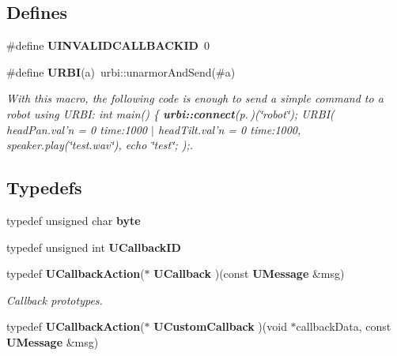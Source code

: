\subsection*{Defines}
\begin{CompactItemize}
\item 
\#define {\bf UINVALIDCALLBACKID}\ 0\label{uabstractclient_8h_a0}

\item 
\#define {\bf URBI}(a)\ urbi::unarmor\-And\-Send(\#a)
\begin{CompactList}\small\item\em With this macro, the following code is enough to send a simple command to a robot using URBI: int main() \{ {\bf urbi::connect}{\rm (p.\,\pageref{namespaceurbi_a7})}(\char`\"{}robot\char`\"{}); URBI( head\-Pan.val'n = 0 time:1000 $|$ head\-Tilt.val'n = 0 time:1000, speaker.play(\char`\"{}test.wav\char`\"{}), echo \char`\"{}test\char`\"{}; );. \item\end{CompactList}\end{CompactItemize}
\subsection*{Typedefs}
\begin{CompactItemize}
\item 
typedef unsigned char {\bf byte}\label{uabstractclient_8h_a2}

\item 
typedef unsigned int {\bf UCallback\-ID}\label{uabstractclient_8h_a6}

\item 
typedef {\bf UCallback\-Action}($\ast$ {\bf UCallback} )(const {\bf UMessage} \&msg)\label{uabstractclient_8h_a7}

\begin{CompactList}\small\item\em Callback prototypes. \item\end{CompactList}\item 
typedef {\bf UCallback\-Action}($\ast$ {\bf UCustom\-Callback} )(void $\ast$callback\-Data, const {\bf UMessage} \&msg)\label{uabstractclient_8h_a8}

\end{CompactItemize}
